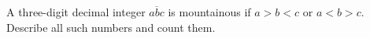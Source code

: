 A three-digit decimal integer $\overline{abc}$ is mountainous if $a>b<c$ or $a<b>c$. Describe all such numbers and count them.
